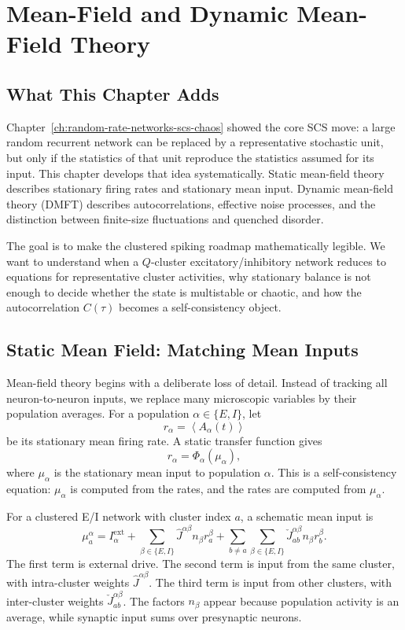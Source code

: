 
\chapter{Mean-Field and Dynamic Mean-Field Theory}
\label{ch:mean-field-dynamic-mean-field-theory}

\section*{What This Chapter Adds}

Chapter~\ref{ch:random-rate-networks-scs-chaos} showed the core SCS move: a
large random recurrent network can be replaced by a representative stochastic
unit, but only if the statistics of that unit reproduce the statistics assumed
for its input. This chapter develops that idea systematically. Static mean-field
theory describes stationary firing rates and stationary mean input. Dynamic
mean-field theory (DMFT) describes autocorrelations, effective noise processes,
and the distinction between finite-size fluctuations and quenched disorder.

The goal is to make the clustered spiking roadmap mathematically legible. We
want to understand when a \(Q\)-cluster excitatory/inhibitory network reduces
to equations for representative cluster activities, why stationary balance is
not enough to decide whether the state is multistable or chaotic, and how the
autocorrelation \(C(\tau)\) becomes a self-consistency object.

\section{Static Mean Field: Matching Mean Inputs}
\label{sec:ch07-static-mean-field}

Mean-field theory begins with a deliberate loss of detail. Instead of tracking
all neuron-to-neuron inputs, we replace many microscopic variables by their
population averages. For a population \(\alpha\in\{E,I\}\), let
\[
        r_\alpha = \left\langle A_\alpha(t)\right\rangle
\]
be its stationary mean firing rate. A static transfer function gives
\[
        r_\alpha = \Phi_\alpha(\mu_\alpha),
        \label{eq:ch07-static-transfer}
\]
where \(\mu_\alpha\) is the stationary mean input to population \(\alpha\).
This is a self-consistency equation: \(\mu_\alpha\) is computed from the rates,
and the rates are computed from \(\mu_\alpha\).

For a clustered E/I network with cluster index \(a\), a schematic mean input is
\[
        \mu_a^\alpha
        =
        I_\alpha^{\mathrm{ext}}
        +
        \sum_{\beta\in\{E,I\}}
        \widehat J^{\alpha\beta}n_\beta r_a^\beta
        +
        \sum_{b\ne a}
        \sum_{\beta\in\{E,I\}}
        \check J_{ab}^{\alpha\beta}n_\beta r_b^\beta .
        \label{eq:ch07-cluster-mean-input}
\]
The first term is external drive. The second term is input from the same
cluster, with intra-cluster weights \(\widehat J^{\alpha\beta}\). The third term is
input from other clusters, with inter-cluster weights
\(\check J_{ab}^{\alpha\beta}\). The factors \(n_\beta\) appear because
population activity is an average, while synaptic input sums over presynaptic
neurons.

